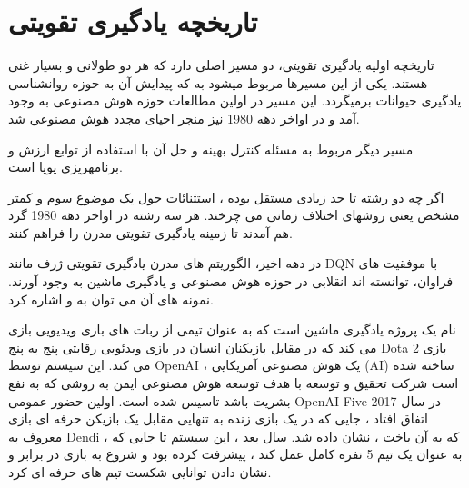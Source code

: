 \section{تاریخچه یادگیری تقویتی}
تاریخچه اولیه یادگیری تقویتی، دو مسیر اصلی دارد که هر دو طولانی و بسیار غنی هستند. یکی از این مسیرها مربوط می\nf شود به  که پیدایش آن به حوزه روانشناسی یادگیری حیوانات برمی\nf گردد. این مسیر در اولین مطالعات حوزه هوش مصنوعی به وجود آمد و در اواخر دهه 1980 نیز منجر احیای مجدد هوش مصنوعی شد.

مسیر دیگر مربوط به مسئله کنترل بهینه و حل آن با استفاده از توابع ارزش و برنامه\nf ریزی پویا است.

 اگر چه
دو رشته تا حد زیادی مستقل بوده ، استثنائات حول یک موضوع سوم و کمتر مشخص یعنی روشهای اختلاف زمانی  می چرخند. هر سه رشته در اواخر دهه 1980 گرد هم آمدند تا زمینه یادگیری تقویتی مدرن را فراهم کنند.




در دهه اخیر، الگوریتم های مدرن یادگیری تقویتی  ژرف مانند DQN با موفقیت های فراوان، توانسته اند انقلابی در حوزه هوش مصنوعی و یادگیری ماشین به وجود آورند. نمونه های آن می توان به
 و
   اشاره کرد.
  
  
   نام یک پروژه یادگیری ماشین است که به عنوان تیمی از ربات های بازی ویدیویی بازی می کند که در مقابل بازیکنان انسان در بازی ویدئویی رقابتی پنج به پنج Dota 2 بازی می کند. این سیستم توسط OpenAI ، یک هوش مصنوعی آمریکایی (AI) ساخته شده است شرکت تحقیق و توسعه با هدف توسعه هوش مصنوعی ایمن به روشی که به نفع بشریت باشد تاسیس شده است. اولین حضور عمومی OpenAI Five در سال 2017 اتفاق افتاد ، جایی که در یک بازی زنده به تنهایی مقابل یک بازیکن حرفه ای بازی معروف به Dendi ، که به آن باخت ، نشان داده شد. سال بعد ، این سیستم تا جایی که به عنوان یک تیم 5 نفره کامل عمل کند ، پیشرفت کرده بود و شروع به بازی در برابر و نشان دادن توانایی شکست تیم های حرفه ای کرد.
   

